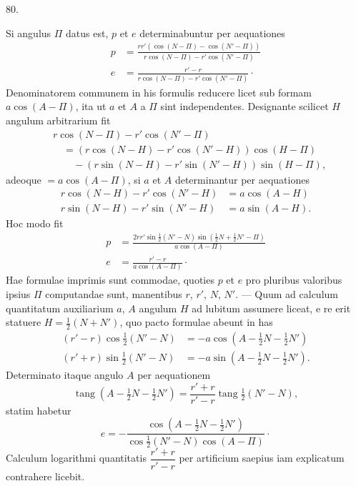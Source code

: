 \medskip
\hypertarget{native-109-article080}{}
\begin{center}80.\end{center}
Si angulus $\Pi$ datus est, $p$ et $e$ determinabuntur per aequationes
\[
\begin{aligned}
p&=\frac{rr'(\cos(N-\Pi)-\cos(N'-\Pi))}{r\cos(N-\Pi)-r'\cos(N'-\Pi)}\\[4pt]
e&=\frac{r'-r}{r\cos(N-\Pi)-r'\cos(N'-\Pi)}\mathpunct{\cdot}
\end{aligned}
\]
Denominatorem communem in his formulis reducere licet sub formam $a\cos(A-\Pi)$, ita ut $a$ et $A$ a $\Pi$ sint independentes. Designante scilicet $H$ angulum arbitrarium fit
\[
\begin{aligned}
&r\cos(N-\Pi)-r'\cos(N'-\Pi)\\
&\quad=(r\cos(N-H)-r'\cos(N'-H))\cos(H-\Pi)\\
&\qquad-(r\sin(N-H)-r'\sin(N'-H))\sin(H-\Pi),
\end{aligned}
\]
adeoque $=a\cos(A-\Pi)$, si $a$ et $A$ determinantur per aequationes
\[
\begin{aligned}
r\cos(N-H)-r'\cos(N'-H)&=a\cos(A-H)\\
r\sin(N-H)-r'\sin(N'-H)&=a\sin(A-H).
\end{aligned}
\]
Hoc modo fit
\[
\begin{aligned}
p&=\frac{2rr'\sin\tfrac12(N'-N)\sin(\tfrac12N+\tfrac12N'-\Pi)}{a\cos(A-\Pi)}\\[4pt]
e&=\frac{r'-r}{a\cos(A-\Pi)}\mathpunct{\cdot}
\end{aligned}
\]
Hae formulae imprimis sunt commodae, quoties $p$ et $e$ pro pluribus valoribus ipsius $\Pi$ computandae sunt, manentibus $r$, $r'$, $N$, $N'$. — Quum ad calculum quantitatum auxiliarium $a$, $A$ angulum $H$ ad lubitum assumere liceat, e re erit statuere $H=\tfrac12(N+N')$, quo pacto formulae abeunt in has
\[
\begin{aligned}
(r'-r)\cos\tfrac12(N'-N)&=-a\cos(A-\tfrac12N-\tfrac12N')\\
(r'+r)\sin\tfrac12(N'-N)&=-a\sin(A-\tfrac12N-\tfrac12N').
\end{aligned}
\]
Determinato itaque angulo $A$ per aequationem
\[
\operatorname{tang}(A-\tfrac12N-\tfrac12N')=\frac{r'+r}{r'-r}\operatorname{tang}\tfrac12(N'-N),
\]
statim habetur
\[
e=-\frac{\cos(A-\tfrac12N-\tfrac12N')}{\cos\tfrac12(N'-N)\cos(A-\Pi)}\mathpunct{\cdot}
\]
Calculum logarithmi quantitatis $\dfrac{r'+r}{r'-r}$ per artificium saepius iam explicatum contrahere licebit.
